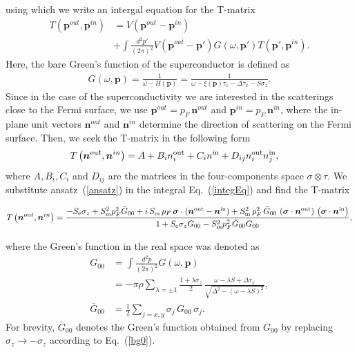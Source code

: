 \documentclass[twocolumn,showpacs,floatfix,nofootinbib,longbibliography]{revtex4-1}
\begin{document}
using which we write an intergal equation for the T-matrix
\begin{align}
	T\left(\bm p^{out},\bm p^{in}\right) &= V \left(\bm p^{out}-\bm p^{in}\right) \nonumber \\
	& + \int \frac{d^2p'}{(2\pi)^2} V\left(\bm p^{out}-\bm p'\right) G(\omega,\bm p')  T\left(\bm p',\bm p^{in}\right).
	\label{integEq}
\end{align}
Here, the bare Green's function of the superconductor is defined as
\begin{align}
	G(\omega,\bm p) = \frac{1}{\omega-H(\bm p)} = \frac{1}{\omega-\xi(\bm p)\tau_z-\Delta \tau_x - S\sigma_z}.
\end{align}
Since in the case of the superconductivity we are interested in the scatterings close to the Fermi surface, we use $\bm p^{out} = p_F\, \bm n^{out}$ and $\bm p^{in} = p_F \,\bm n^{in}$, where the in-plane unit vectors $\bm n^{out}$ and $\bm n^{in}$ determine the direction of scattering on the Fermi surface.  Then, we seek the T-matrix in the following form
\begin{align}
	T\left(\bm n^{out},\bm n^{in}\right) &= A + B_i n^{\rm out}_i + C_i n^{\rm in} + D_{ij} n^{\rm out}_i n^{\rm in}_j, \label{ansatz}
\end{align}
where  $A,B_i,C_i$ and $D_{ij}$ are the matrices in the four-components space $\sigma\otimes\tau$. We substitute ansatz~(\ref{ansatz}) in the integral Eq.~(\ref{integEq}) and find the T-matrix
\begin{widetext}
\begin{equation}
	T\left(\bm n^{out},\bm n^{in}\right) = \frac{-S_{\rm e}\sigma_z+S^2_{\rm m}p_F^2\bar G_{00}+i\,S_{\rm m}\,p_F \,  \bm \sigma\cdot(\bm n^{\rm out}- \bm n^{\rm in}) +S^2_{\rm m}\, p^2_F \, \bar G_{00}\,\left(\bm \sigma\cdot\bm n^{\rm out}\right)\,\left(\bm \sigma\cdot \bm n^{\rm in}\right)}{1+S_{\rm e}\sigma_zG_{00}-S^2_{\rm m}p_F^2\bar G_{00} G_{00}},
\end{equation}
\end{widetext}
where the Green's function in the real space was denoted as
\begin{align}
	G_{00} &   = \int \frac{d^2 p}{(2\pi)^2} G(\omega,\bm p)  	\label{g0} \\
	 & =-\pi\rho\sum_{\lambda = \pm 1} \frac{1+\lambda\sigma_z}{2}\,\frac{\omega-\lambda S+\Delta\tau_x}{\sqrt{\Delta^2-\left( \omega-\lambda S \right)^2}}, \nonumber \\
	 \bar G_{00} & = \frac{1}{2} \sum_{j=x,y}\sigma_j\, G_{00}\, \sigma_j.\label{bg0}
\end{align}
For brevity, $\bar G_{00}$ denotes the Green's function obtained from $G_{00}$ by replacing $\sigma_z \rightarrow - \sigma_z$ according to Eq.~(\ref{bg0}).
\end{document}
